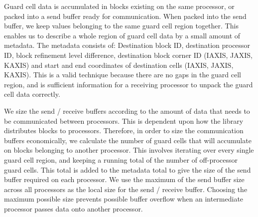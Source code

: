 Guard cell data is accumulated in blocks existing on the same
processor, or packed into a send buffer ready for communication.  When
packed into the send buffer, we keep values belonging to the same
guard cell region together.  This enables us to describe a whole
region of guard cell data by a small amount of metadata.  The metadata
consists of: Destination block ID, destination processor ID, block
refinement level difference, destination block corner ID (IAXIS,
JAXIS, KAXIS) and start and end coordinates of destination cells
(IAXIS, JAXIS, KAXIS).  This is a valid technique because there are no
gaps in the guard cell region, and is sufficient information for a
receiving processor to unpack the guard cell data correctly.


We size the send / receive buffers according to the amount of data
that needs to be communicated between processors.  This is dependent
upon how the \Paramesh library distributes blocks to processors.
Therefore, in order to size the communication buffers economically, we
calculate the number of guard cells that will accumulate on blocks
belonging to another processor.  This involves iterating over every
single guard cell region, and keeping a running total of the number of
off-processor guard cells.  This total is added to the metadata total
to give the size of the send buffer required on each processor.  We use the maximum of the
send buffer size across all processors as the local size for the send
/ receive buffer.  Choosing the maximum possible size prevents
possible buffer overflow when an intermediate processor passes data
onto another processor.


